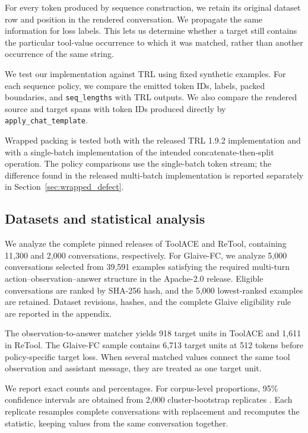 \documentclass[pdflatex,sn-basic,Numbered]{sn-jnl}
\begin{document}
For every token produced by sequence construction, we retain its original dataset row and position in the rendered conversation. We propagate the same information for loss labels. This lets us determine whether a target still contains the particular tool-value occurrence to which it was matched, rather than another occurrence of the same string.

We test our implementation against TRL using fixed synthetic examples. For each sequence policy, we compare the emitted token IDs, labels, packed boundaries, and \texttt{seq\_lengths} with TRL outputs. We also compare the rendered source and target spans with token IDs produced directly by \texttt{apply\_chat\_template}.

Wrapped packing is tested both with the released TRL 1.9.2 implementation and with a single-batch implementation of the intended concatenate-then-split operation. The policy comparisons use the single-batch token stream; the difference found in the released multi-batch implementation is reported separately in Section~\ref{sec:wrapped_defect}.


\subsection{Datasets and statistical analysis}
\label{sec:datasets}

We analyze the complete pinned releases of ToolACE and ReTool, containing 11,300 and 2,000 conversations, respectively. For Glaive-FC, we analyze 5,000 conversations selected from 39,591 examples satisfying the required multi-turn action--observation--answer structure in the Apache-2.0 release. Eligible conversations are ranked by SHA-256 hash, and the 5,000 lowest-ranked examples are retained. Dataset revisions, hashes, and the complete Glaive eligibility rule are reported in the appendix.

The observation-to-answer matcher yields 918 target units in ToolACE and 1,611 in ReTool. The Glaive-FC sample contains 6,713 target units at 512 tokens before policy-specific target loss. When several matched values connect the same tool observation and assistant message, they are treated as one target unit.

We report exact counts and percentages. For corpus-level proportions, 95\% confidence intervals are obtained from 2,000 cluster-bootstrap replicates \citep{efron1994bootstrap}. Each replicate resamples complete conversations with replacement and recomputes the statistic, keeping values from the same conversation together.
\end{document}
